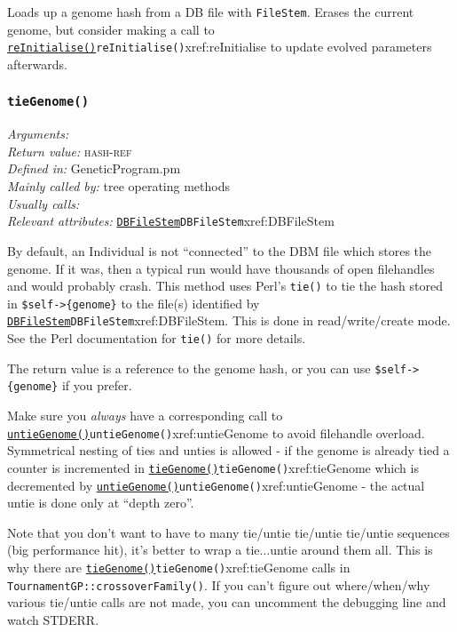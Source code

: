 \documentclass[a4paper]{article}
\begin{document}
Loads up a genome hash from a DB file with \texttt{FileStem}.  Erases
the current genome, but consider making a call to
\hyperref[no]{\texttt{reInitialise()}}{\texttt{reInitialise()}}{xref:reInitialise} to update evolved parameters afterwards.


\subsubsection{\texttt{tieGenome()}}\label{xref:tieGenome}
\begin{flushleft}
\textit{Arguments:} \\
\textit{Return value:} \textsc{hash-ref}\\
\textit{Defined in:} GeneticProgram.pm\\
\textit{Mainly called by:} tree operating methods\\
\textit{Usually calls:} \\
\textit{Relevant attributes:} \hyperref[no]{\texttt{DBFileStem}}{\texttt{DBFileStem}}{xref:DBFileStem}
\end{flushleft}

By default, an Individual is not ``connected'' to the DBM file
which stores the genome.  If it was, then a typical run would
have thousands of open filehandles and would probably crash.
This method uses Perl's \texttt{tie()} to tie the hash stored
in \verb:$self->{genome}: %
to the file(s) identified by \hyperref[no]{\texttt{DBFileStem}}{\texttt{DBFileStem}}{xref:DBFileStem}.  This is
done in read/write/create mode.  See the Perl documentation
for \texttt{tie()} for more details.

The return value is a reference to the genome hash, or you
can use \verb:$self->{genome}: %
if you prefer.

Make sure you \textit{always} have a corresponding call
to \hyperref[no]{\texttt{untieGenome()}}{\texttt{untieGenome()}}{xref:untieGenome} to avoid filehandle overload.
Symmetrical nesting of ties and unties is allowed - if
the genome is already tied a counter is incremented
in \hyperref[no]{\texttt{tieGenome()}}{\texttt{tieGenome()}}{xref:tieGenome} which is decremented by
\hyperref[no]{\texttt{untieGenome()}}{\texttt{untieGenome()}}{xref:untieGenome} - the actual untie is done only
at ``depth zero''.

Note that you don't want to have to many tie/untie tie/untie tie/untie
sequences (big performance hit), it's better to wrap a tie...untie
around them all.  This is why there are \hyperref[no]{\texttt{tieGenome()}}{\texttt{tieGenome()}}{xref:tieGenome} calls in
\texttt{TournamentGP::crossoverFamily()}.  If you can't figure out
where/when/why various tie/untie calls are not made, you can uncomment
the debugging line and watch STDERR.
\end{document}
